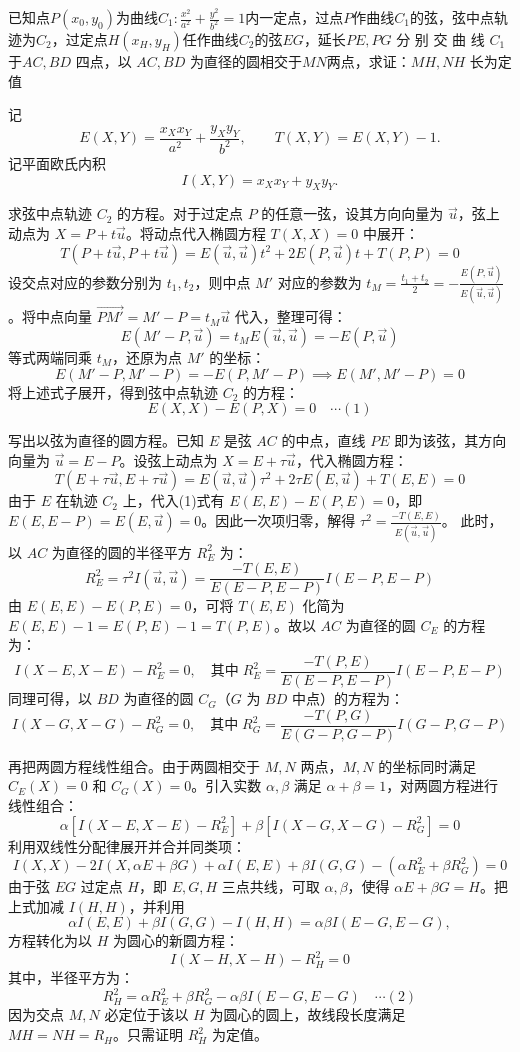 \begin{exercise}
已知点$P(x_0,y_0)$为曲线$C_1:\frac{x^2}{a^2}+\frac{y^2}{b^2}=1$内一定点，过点$P$作曲线$C_1$的弦，弦中点轨迹为$C_2$，过定点$H(x_H,y_H)$任作曲线$C_2$的弦$EG$，延长$PE, PG$ 分 别 交 曲 线 $C_1$于$AC,BD$ 四点，以 $AC,BD$ 为直径的圆相交于$MN$两点，求证：$MH,NH$ 长为定值
\end{exercise}
\begin{solution}
记
\[
E(X,Y) = \frac{x_X x_Y}{a^2} + \frac{y_X y_Y}{b^2},\qquad T(X,Y) = E(X,Y) - 1.
\]
记平面欧氏内积
\[
I(X,Y) = x_X x_Y + y_X y_Y.
\]

求弦中点轨迹 $C_2$ 的方程。对于过定点 $P$ 的任意一弦，设其方向向量为 $\vec{u}$，弦上动点为 $X = P + t\vec{u}$。将动点代入椭圆方程 $T(X,X)=0$ 中展开：
$$T(P+t\vec{u}, P+t\vec{u}) = E(\vec{u},\vec{u})t^2 + 2E(P,\vec{u})t + T(P,P) = 0$$
设交点对应的参数分别为 $t_1, t_2$，则中点 $M'$ 对应的参数为 $t_M = \frac{t_1+t_2}{2} = -\frac{E(P,\vec{u})}{E(\vec{u},\vec{u})}$。将中点向量 $\overrightarrow{PM'} = M'-P = t_M \vec{u}$ 代入，整理可得：
$$E(M'-P, \vec{u}) = t_M E(\vec{u},\vec{u}) = -E(P,\vec{u})$$
等式两端同乘 $t_M$，还原为点 $M'$ 的坐标：
$$E(M'-P, M'-P) = -E(P, M'-P) \implies E(M', M'-P) = 0$$
将上述式子展开，得到弦中点轨迹 $C_2$ 的方程：
$$E(X,X) - E(P,X) = 0 \quad \cdots (1)$$

写出以弦为直径的圆方程。已知 $E$ 是弦 $AC$ 的中点，直线 $PE$ 即为该弦，其方向向量为 $\vec{u} = E-P$。设弦上动点为 $X = E + \tau\vec{u}$，代入椭圆方程：
$$T(E+\tau\vec{u}, E+\tau\vec{u}) = E(\vec{u},\vec{u})\tau^2 + 2\tau E(E, \vec{u}) + T(E,E) = 0$$
由于 $E$ 在轨迹 $C_2$ 上，代入(1)式有 $E(E,E) - E(P,E) = 0$，即 $E(E, E-P) = E(E,\vec{u}) = 0$。因此一次项归零，解得 $\tau^2 = \frac{-T(E,E)}{E(\vec{u},\vec{u})}$。
此时，以 $AC$ 为直径的圆的半径平方 $R_E^2$ 为：
$$R_E^2 = \tau^2 I(\vec{u},\vec{u}) = \frac{-T(E,E)}{E(E-P, E-P)} I(E-P, E-P)$$
由 $E(E,E) - E(P,E) = 0$，可将 $T(E,E)$ 化简为 $E(E,E)-1 = E(P,E)-1 = T(P,E)$。故以 $AC$ 为直径的圆 $C_E$ 的方程为：
$$I(X-E, X-E) - R_E^2 = 0, \quad \text{其中} \; R_E^2 = \frac{-T(P,E)}{E(E-P, E-P)} I(E-P, E-P)$$
同理可得，以 $BD$ 为直径的圆 $C_G$（$G$ 为 $BD$ 中点）的方程为：
$$I(X-G, X-G) - R_G^2 = 0, \quad \text{其中} \; R_G^2 = \frac{-T(P,G)}{E(G-P, G-P)} I(G-P, G-P)$$

再把两圆方程线性组合。由于两圆相交于 $M, N$ 两点，$M, N$ 的坐标同时满足 $C_E(X)=0$ 和 $C_G(X)=0$。引入实数 $\alpha, \beta$ 满足 $\alpha + \beta = 1$，对两圆方程进行线性组合：
$$\alpha [I(X-E, X-E) - R_E^2] + \beta [I(X-G, X-G) - R_G^2] = 0$$
利用双线性分配律展开并合并同类项：
$$I(X,X) - 2I(X, \alpha E + \beta G) + \alpha I(E,E) + \beta I(G,G) - (\alpha R_E^2 + \beta R_G^2) = 0$$
由于弦 $EG$ 过定点 $H$，即 $E, G, H$ 三点共线，可取 $\alpha, \beta$，使得 $\alpha E + \beta G = H$。把上式加减 $I(H,H)$，并利用
\[
\alpha I(E,E)+\beta I(G,G)-I(H,H)=\alpha\beta I(E-G,E-G),
\]
方程转化为以 $H$ 为圆心的新圆方程：
$$I(X-H, X-H) - R_H^2 = 0$$
其中，半径平方为：
$$R_H^2 = \alpha R_E^2 + \beta R_G^2 - \alpha\beta I(E-G, E-G) \quad \cdots (2)$$
因为交点 $M, N$ 必定位于该以 $H$ 为圆心的圆上，故线段长度满足 $MH = NH = R_H$。只需证明 $R_H^2$ 为定值。


\end{solution}
